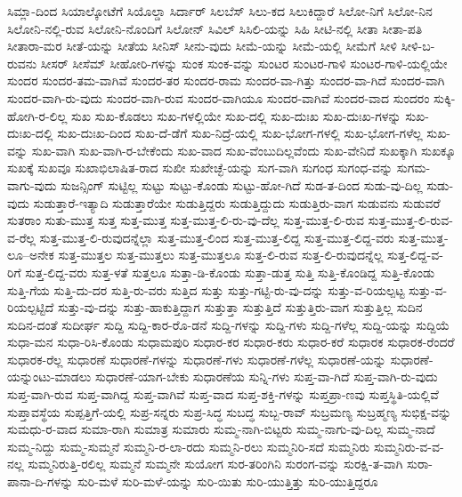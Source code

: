{ಸಿಮ್ಲಾ-ದಿಂದ
ಸಿಯಾಲ್ಕೋಟೆಗೆ
ಸಿಯೊಲ್ಡಾ
ಸಿರ್ದಾರ್
ಸಿಲಬೆಸ್
ಸಿಲು-ಕದ
ಸಿಲುಕಿದ್ದಾರೆ
ಸಿಲೋ-ನಿಗೆ
ಸಿಲೋ-ನಿನ
ಸಿಲೋನಿ-ನಲ್ಲಿ-ರುವ
ಸಿಲೋನಿ-ನೊಂದಿಗೆ
ಸಿಲೋನ್
ಸಿವಿಲ್
ಸಿಸಿಲಿ-ಯನ್ನು
ಸಿಹಿ
ಸೀಟಿ-ನಲ್ಲಿ
ಸೀತಾ
ಸೀತಾ-ಪತಿ
ಸೀತಾರಾ-ಮರ
ಸೀತೆ-ಯನ್ನು
ಸೀತೆಯ
ಸೀನಿಸ್
ಸೀನು-ವುದು
ಸೀಮೆ-ಯನ್ನು
ಸೀಮೆ-ಯಲ್ಲಿ
ಸೀಮೆಗೆ
ಸೀಳಿ
ಸೀಳಿ-ಬ-ರುವನು
ಸೀಸರ್
ಸೀಸೆಮ್
ಸೀಹೋರಿ-ಗಳನ್ನು
ಸುಂಕ
ಸುಂಕ-ವನ್ನು
ಸುಂಟರ
ಸುಂಟರ-ಗಾಳಿ
ಸುಂಟರ-ಗಾಳಿ-ಯಲ್ಲಿಯೇ
ಸುಂದರ
ಸುಂದರ-ತಮ-ವಾಗಿವೆ
ಸುಂದರ-ತರ
ಸುಂದರ-ರಾಮ
ಸುಂದರ-ವಾ-ಗಿತ್ತು
ಸುಂದರ-ವಾ-ಗಿದೆ
ಸುಂದರ-ವಾಗಿ
ಸುಂದರ-ವಾಗಿ-ರು-ವುದು
ಸುಂದರ-ವಾಗಿ-ರುವ
ಸುಂದರ-ವಾಗಿಯೂ
ಸುಂದರ-ವಾಗಿವೆ
ಸುಂದರ-ವಾದ
ಸುಂದರಂ
ಸುಕ್ಕಿ-ಹೋಗಿ-ರ-ಲಿಲ್ಲ
ಸುಖ
ಸುಖ-ಕೊಡಲು
ಸುಖ-ಗಳಲ್ಲಿಯೇ
ಸುಖ-ದಲ್ಲಿ
ಸುಖ-ದುಃಖ
ಸುಖ-ದುಃಖ-ಗಳನ್ನು
ಸುಖ-ದುಃಖ-ದಲ್ಲಿ
ಸುಖ-ದುಃಖ-ದಿಂದ
ಸುಖ-ದೆ-ಡೆಗೆ
ಸುಖ-ನಿದ್ರೆ-ಯಲ್ಲಿ
ಸುಖ-ಭೋಗ-ಗಳಲ್ಲಿ
ಸುಖ-ಭೋಗ-ಗಳೆಲ್ಲ
ಸುಖ-ವನ್ನು
ಸುಖ-ವಾಗಿ
ಸುಖ-ವಾಗಿ-ರ-ಬೇಕೆಂದು
ಸುಖ-ವಾದ
ಸುಖ-ವೆಂಬುದಿಲ್ಲವೆಂದು
ಸುಖ-ವೇನಿದೆ
ಸುಖಕ್ಕಾಗಿ
ಸುಖಕ್ಕೂ
ಸುಖಕ್ಕೆ
ಸುಖವೂ
ಸುಖಾಭಿಲಾಷಿತ-ರಾದ
ಸುಖೀ
ಸುಖೇಚ್ಛೆ-ಯನ್ನು
ಸುಗ-ವಾಗಿ
ಸುಗಂಧ
ಸುಗಂಧ-ವನ್ನು
ಸುಗಮ-ವಾಗು-ವುದು
ಸುಜನ್ಸಿಂಗ್
ಸುಟ್ಟಿಲ್ಲ
ಸುಟ್ಟು
ಸುಟ್ಟು-ಕೊಂಡು
ಸುಟ್ಟು-ಹೋ-ಗಿದೆ
ಸುಡ-ತ-ದಿಂದ
ಸುಡು-ವು-ದಿಲ್ಲ
ಸುಡು-ವುದು
ಸುಡುತ್ತಾರೆ-ಇತ್ಯಾದಿ
ಸುಡುತ್ತಾರೆಯೇ
ಸುಡುತ್ತಿದ್ದರು
ಸುಡುತ್ತಿದ್ದುದು
ಸುಡುತ್ತಿರು-ವಾಗ
ಸುಡುವನು
ಸುಡುವರೆ
ಸುತರಾಂ
ಸುತು-ಮುತ್ತ
ಸುತ್ತ
ಸುತ್ತ-ಮುತ್ತ
ಸುತ್ತ-ಮುತ್ತ-ಲಿ-ರು-ವು-ದೆಲ್ಲ
ಸುತ್ತ-ಮುತ್ತ-ಲಿ-ರುವ
ಸುತ್ತ-ಮುತ್ತ-ಲಿ-ರುವ-ವ-ರೆಲ್ಲ
ಸುತ್ತ-ಮುತ್ತ-ಲಿ-ರುವುದನ್ನೆಲ್ಲಾ
ಸುತ್ತ-ಮುತ್ತ-ಲಿಂದ
ಸುತ್ತ-ಮುತ್ತ-ಲಿದ್ದ
ಸುತ್ತ-ಮುತ್ತ-ಲಿದ್ದ-ವರು
ಸುತ್ತ-ಮುತ್ತ-ಲೂ--ಅನೇಕ
ಸುತ್ತ-ಮುತ್ತಲ
ಸುತ್ತ-ಮುತ್ತಲು
ಸುತ್ತ-ಮುತ್ತಲೂ
ಸುತ್ತ-ಲಿ-ರುವ
ಸುತ್ತ-ಲಿ-ರುವುದನ್ನೆಲ್ಲ
ಸುತ್ತ-ಲಿದ್ದ-ವ-ರಿಗೆ
ಸುತ್ತ-ಲಿದ್ದ-ವರು
ಸುತ್ತ-ಳತೆ
ಸುತ್ತಲೂ
ಸುತ್ತಾ-ಡಿ-ಕೊಂಡು
ಸುತ್ತಾ-ಡುತ್ತ
ಸುತ್ತಿ
ಸುತ್ತಿ-ಕೊಂಡಿದ್ದ
ಸುತ್ತಿ-ಕೊಂಡು
ಸುತ್ತಿ-ಗೆಯ
ಸುತ್ತಿ-ದು-ದರ
ಸುತ್ತಿ-ರು-ವರು
ಸುತ್ತಿದ
ಸುತ್ತು
ಸುತ್ತು-ಗಟ್ಟಿ-ರು-ವು-ದನ್ನು
ಸುತ್ತು-ವ-ರಿಯಲ್ಪಟ್ಟ
ಸುತ್ತು-ವ-ರಿಯಲ್ಪಟ್ಟಿದೆ
ಸುತ್ತು-ವು-ದನ್ನು
ಸುತ್ತು-ಹಾಕುತ್ತಿದ್ದಾಗ
ಸುತ್ತುತ್ತಾ
ಸುತ್ತುತ್ತಿದೆ
ಸುತ್ತುತ್ತಿರು-ವಾಗ
ಸುತ್ತುತ್ತಿಲ್ಲ
ಸುದಿನ
ಸುದಿನ-ದಂತೆ
ಸುದೀರ್ಘ
ಸುದ್ದಿ
ಸುದ್ದಿ-ಕಾರ-ರೊ-ಡನೆ
ಸುದ್ದಿ-ಗಳನ್ನು
ಸುದ್ದಿ-ಗಳು
ಸುದ್ದಿ-ಗಳೆಲ್ಲ
ಸುದ್ದಿ-ಯನ್ನು
ಸುದ್ದಿಯೆ
ಸುಧಾ-ಮನ
ಸುಧಾ-ರಿಸಿ-ಕೊಂಡು
ಸುಧಾಮಪುರಿ
ಸುಧಾರ-ಕರ
ಸುಧಾರ-ಕರು
ಸುಧಾರ-ಕರೆ
ಸುಧಾರಕ
ಸುಧಾರಕ-ರೆಂದರೆ
ಸುಧಾರಕ-ರೆಲ್ಲ
ಸುಧಾರಣೆ
ಸುಧಾರಣೆ-ಗಳನ್ನು
ಸುಧಾರಣೆ-ಗಳು
ಸುಧಾರಣೆ-ಗಳೆಲ್ಲ
ಸುಧಾರಣೆ-ಯನ್ನು
ಸುಧಾರಣೆ-ಯನ್ನುಂಟು-ಮಾಡಲು
ಸುಧಾರಣೆ-ಯಾಗ-ಬೇಕು
ಸುಧಾರಣೆಯ
ಸುನ್ನಿ-ಗಳು
ಸುಪ್ತ-ವಾ-ಗಿದೆ
ಸುಪ್ತ-ವಾಗಿ-ರು-ವುದು
ಸುಪ್ತ-ವಾಗಿ-ರುವ
ಸುಪ್ತ-ವಾಗಿದ್ದ
ಸುಪ್ತ-ವಾಗಿವೆ
ಸುಪ್ತ-ವಾದ
ಸುಪ್ತ-ಶಕ್ತಿ-ಗಳನ್ನು
ಸುಪ್ತಪ್ರಾ-ಣವು
ಸುಪ್ತಸ್ಥಿತಿ-ಯಲ್ಲಿವೆ
ಸುಪ್ತಾವಸ್ಥೆಯ
ಸುಪ್ಪತ್ತಿಗೆ-ಯಲ್ಲಿ
ಸುಪ್ರ-ಸನ್ನರು
ಸುಪ್ರ-ಸಿದ್ಧ
ಸುಬದ್ಧ
ಸುಬ್ಬ-ರಾವ್
ಸುಬ್ರಮಣ್ಯ
ಸುಬ್ರಹ್ಮಣ್ಯ
ಸುಭಿಕ್ಷ-ವನ್ನು
ಸುಮಧು-ರ-ವಾದ
ಸುಮಾ-ರಾಗಿ
ಸುಮಾತ್ರ
ಸುಮಾರು
ಸುಮ್ಮ-ನಾಗಿ-ಬಿಟ್ಟರು
ಸುಮ್ಮ-ನಾಗು-ವು-ದಿಲ್ಲ
ಸುಮ್ಮ-ನಾದೆ
ಸುಮ್ಮ-ನಿದ್ದು
ಸುಮ್ಮ-ಸುಮ್ಮನೆ
ಸುಮ್ಮನಿ-ರ-ಲಾ-ರದು
ಸುಮ್ಮನಿ-ರಲು
ಸುಮ್ಮನಿರಿ-ಸದೆ
ಸುಮ್ಮನಿರು
ಸುಮ್ಮನಿರು-ವ-ವ-ನಲ್ಲ
ಸುಮ್ಮನಿರುತ್ತಿ-ರಲಿಲ್ಲ
ಸುಮ್ಮನೆ
ಸುಮ್ಮನೇ
ಸುಯೋಗ
ಸುರ-ತರಿಂಗಿನಿ
ಸುರಂಗ-ವನ್ನು
ಸುರಕ್ಷಿ-ತ-ವಾಗಿ
ಸುರಾ-ಪಾನಾ-ದಿ-ಗಳನ್ನು
ಸುರಿ-ಮಳೆ
ಸುರಿ-ಮಳೆ-ಯನ್ನು
ಸುರಿ-ಯಿತು
ಸುರಿ-ಯುತ್ತಿತ್ತು
ಸುರಿ-ಯುತ್ತಿದ್ದರೂ
}

